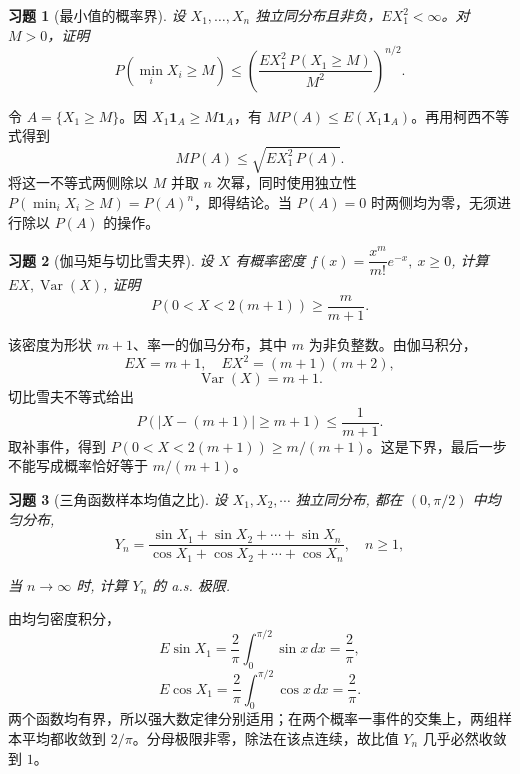 \documentclass[12pt,fontset=fandol]{ctexart}
\newtheorem{exercise}{习题}[section]
\begin{document}
\begin{exercise}[最小值的概率界]\label{q:A7.4}
设 $X_1,\ldots,X_n$ 独立同分布且非负，$EX_1^2<\infty$。对 $M>0$，证明\[P(\min_iX_i\ge M)\le\left(\frac{EX_1^2\,P(X_1\ge M)}{M^2}\right)^{n/2}.\]\par{}
\end{exercise}

\begin{solve}\label{a:A7.4}令 $A=\{X_1\ge M\}$。因 $X_1\mathbf1_A\ge M\mathbf1_A$，有 $MP(A)\le E(X_1\mathbf1_A)$。再用柯西不等式得到\[MP(A)\le\sqrt{EX_1^2\,P(A)}.\]将这一不等式两侧除以 $M$ 并取 $n$ 次幂，同时使用独立性 $P(\min_iX_i\ge M)=P(A)^n$，即得结论。当 $P(A)=0$ 时两侧均为零，无须进行除以 $P(A)$ 的操作。\end{solve}

\begin{exercise}[伽马矩与切比雪夫界]\label{q:A7.5}
设 $X$ 有概率密度 $f(x)=\dfrac{x^m}{m!}e^{-x},\ x\geq0$, 计算 $EX,\operatorname{Var}(X)$, 证明
    \[P(0<X<2(m+1))\geq\dfrac{m}{m+1}.\]\par{}
\end{exercise}

\begin{solve}\label{a:A7.5}该密度为形状 $m+1$、率一的伽马分布，其中 $m$ 为非负整数。由伽马积分，\[EX=m+1,\quad EX^2=(m+1)(m+2),\]\[\operatorname{Var}(X)=m+1.\]切比雪夫不等式给出\[P(|X-(m+1)|\ge m+1)\le\frac1{m+1}.\]取补事件，得到 $P(0<X<2(m+1))\ge m/(m+1)$。这是下界，最后一步不能写成概率恰好等于 $m/(m+1)$。\end{solve}

\begin{exercise}[三角函数样本均值之比]\label{q:A7.10}
设 $X_1,X_2,\cdots$ 独立同分布, 都在 $(0,\pi/2)$ 中均匀分布,
    \[Y_n=\dfrac{\sin X_1+\sin X_2+\cdots+\sin X_n}{\cos X_1+\cos X_2+\cdots+\cos X_n},\quad n\geq1,\]
    
    当 $n\to\infty$ 时, 计算 $Y_n$ 的 a.s. 极限.\par{}
\end{exercise}

\begin{solve}\label{a:A7.10}由均匀密度积分，\[E\sin X_1=\frac2\pi\int_0^{\pi/2}\sin x\,dx=\frac2\pi,\]\[E\cos X_1=\frac2\pi\int_0^{\pi/2}\cos x\,dx=\frac2\pi.\]两个函数均有界，所以强大数定律分别适用；在两个概率一事件的交集上，两组样本平均都收敛到 $2/\pi$。分母极限非零，除法在该点连续，故比值 $Y_n$ 几乎必然收敛到 $1$。\end{solve}
\end{document}
